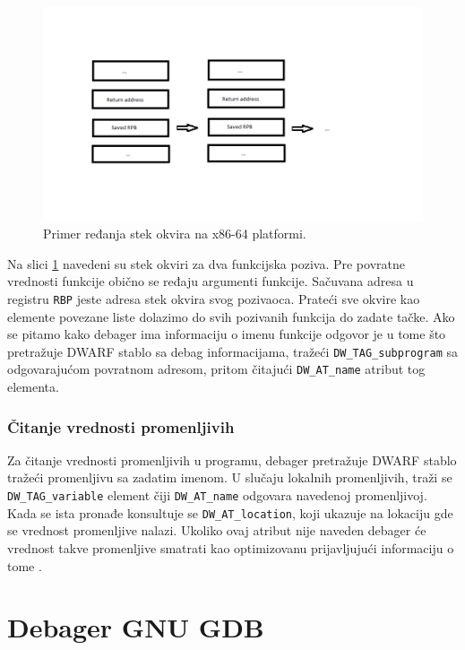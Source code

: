 \documentclass[12pt,oneside]{memoir}
\begin{document}
\begin{figure}[h!]
	\begin{center}
		\includegraphics[scale=0.6]{slike/stack_frame.png}
	\end{center}
	\caption{Primer ređanja stek okvira na x86-64 platformi.}
	\label{fig:stack}
\end{figure}

Na slici \ref{fig:stack} navedeni su stek okviri za dva funkcijska poziva. Pre povratne vrednosti funkcije obično se ređaju argumenti funkcije. Sačuvana adresa u registru \texttt{RBP} jeste adresa stek okvira svog pozivaoca. Prateći sve okvire kao elemente povezane liste dolazimo do svih pozivanih funkcija do zadate tačke. Ako se pitamo kako debager ima informaciju o imenu funkcije odgovor je u tome što pretražuje DWARF stablo sa debag informacijama, tražeći \texttt{DW\_TAG\_subprogram} sa odgovarajućom povratnom adresom, pritom čitajući \texttt{DW\_AT\_name} atribut tog elementa.

\subsection{Čitanje vrednosti promenljivih}

Za čitanje vrednosti promenljivih u programu, debager pretražuje DWARF stablo tražeći promenljivu sa zadatim imenom. U slučaju lokalnih promenljivih, traži se \texttt{DW\_TAG\_variable} element čiji \texttt{DW\_AT\_name} odgovara navedenoj promenljivoj. Kada se ista pronađe konsultuje se \texttt{DW\_AT\_location}, koji ukazuje na lokaciju gde se vrednost promenljive nalazi. Ukoliko ovaj atribut nije naveden debager će vrednost takve promenljive smatrati kao optimizovanu prijavljujući informaciju o tome \cite{GDB}.

\chapter{Debager GNU GDB}
\label{chp:GDB}
\end{document}
